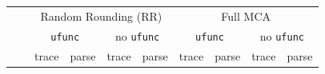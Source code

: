 \documentclass[11pt]{article}
\begin{document}
\begin{table}[]
    \centering
    \begin{tabular}{|ll|c|c|c|c||c|c|c|c|}
    \hline
    \multicolumn{2}{|c}{ \multirow{3}{*}{Application} } & \multicolumn{4}{|c||}{Random Rounding (RR)} & \multicolumn{4}{c|}{Full MCA} \\\cline{3-10}
         &   & \multicolumn{2}{c|}{\texttt{ufunc}} & \multicolumn{2}{c||}{no \texttt{ufunc}} & \multicolumn{2}{c|}{\texttt{ufunc}} & \multicolumn{2}{c|}{no \texttt{ufunc}} \\\cline{3-10}
    & & trace & parse &  trace & parse & trace & parse & trace & parse \\
    \hline
    

\end{tabular}
\end{table}
\end{document}
